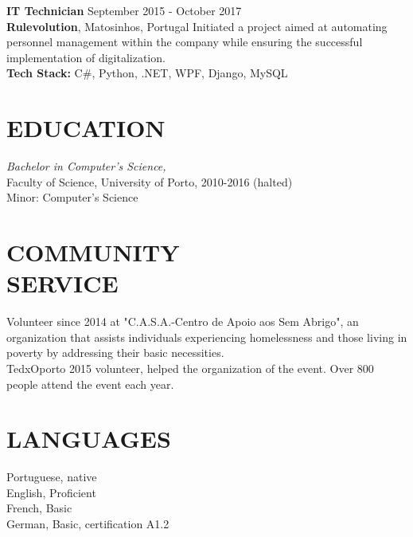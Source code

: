 \documentclass[margin, 10pt]{res} %
\begin{document}
\begin{resume}
    
    \textbf{IT Technician} \hfill September 2015 - October 2017\\
    \textbf{Rulevolution}, Matosinhos, Portugal
    Initiated a project aimed at automating personnel management within the company while ensuring the successful implementation of digitalization.\\
    \textbf {Tech Stack:} C\#, Python, .NET, WPF, Django, MySQL



    \section{EDUCATION}

     {\sl Bachelor in Computer's Science,} \\
    Faculty of Science, University of Porto, 2010-2016 (halted)  \\
    Minor: Computer's Science


    \section{COMMUNITY \\ SERVICE}

    Volunteer since 2014 at "C.A.S.A.-Centro de Apoio aos Sem Abrigo", an organization that assists individuals experiencing homelessness and those living in poverty by addressing their basic necessities.\\
    TedxOporto 2015 volunteer, helped the organization of the event. Over 800 people attend the event each year.

    \section{LANGUAGES}
    Portuguese, native\\
    English, Proficient\\
    French, Basic\\
    German, Basic, certification A1.2


\end{resume}
\end{document}

